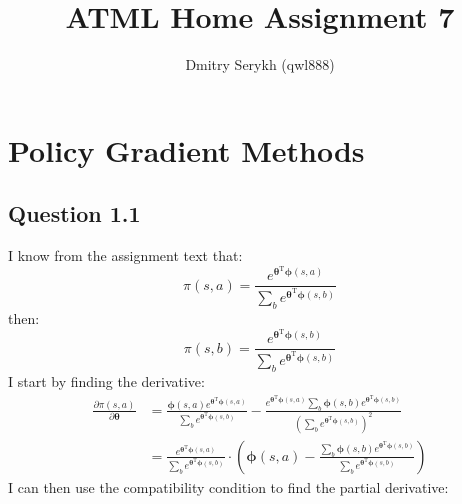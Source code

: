 \documentclass[a4paper]{article}
\title{\vspace{-5cm}ATML Home Assignment 7}
\author{Dmitry Serykh (qwl888)}
\newcommand*{\bs}[1]{\boldsymbol{#1}}
\begin{document}
\maketitle
\section{Policy Gradient Methods}
\label{sec:1}
\subsection*{Question 1.1}
\label{subsec:11}
I know from the assignment text that:
\[
\pi(s, a)=\frac{e^{\boldsymbol{\theta}^{\mathrm{T}} \boldsymbol{\phi}(s, a)}}
   {\sum_{b} e^{\boldsymbol{\theta}^{\mathrm{T}} \boldsymbol{\phi}(s, b)}}
\]
then:
\[
\pi(s, b)=\frac{e^{\boldsymbol{\theta}^{\mathrm{T}} \boldsymbol{\phi}(s, b)}}
   {\sum_{b} e^{\boldsymbol{\theta}^{\mathrm{T}} \boldsymbol{\phi}(s, b)}}
\]
I start by finding the derivative:
\begin{align}
  \label{der}
  \frac{\partial \pi(s, a)}{\partial \bs{\theta}} &=
  \frac{\bs{\phi}(s,a) e^{\boldsymbol{\theta}^{\mathrm{T}} \boldsymbol{\phi}(s, a)}}
       {\sum_{b} e^{\boldsymbol{\theta}^{\mathrm{T}} \boldsymbol{\phi}(s, b)}}
  -
  \frac{e^{\boldsymbol{\theta}^{\mathrm{T}} \boldsymbol{\phi}(s, a)}
        \sum_{b} \boldsymbol{\phi}(s, b)e^{\boldsymbol{\theta}^{\mathrm{T}} \boldsymbol{\phi}(s, b)}}
       {(\sum_{b} e^{\boldsymbol{\theta}^{\mathrm{T}} \boldsymbol{\phi}(s, b)})^2}\\
       &=\frac{e^{\boldsymbol{\theta}^{\mathrm{T}} \boldsymbol{\phi}(s, a)}}
              {\sum_{b} e^{\boldsymbol{\theta}^{\mathrm{T}} \boldsymbol{\phi}(s, b)}}
         \cdot
         \left(
         \boldsymbol{\phi}(s, a)-
         \frac{\sum_{b} \boldsymbol{\phi}(s, b)e^{\boldsymbol{\theta}^{\mathrm{T}} \boldsymbol{\phi}(s, b)}}
              {\sum_{b} e^{\boldsymbol{\theta}^{\mathrm{T}} \boldsymbol{\phi}(s, b)}}
         \right)
\end{align}
I can then use the compatibility condition to find the partial derivative:
\end{document}
